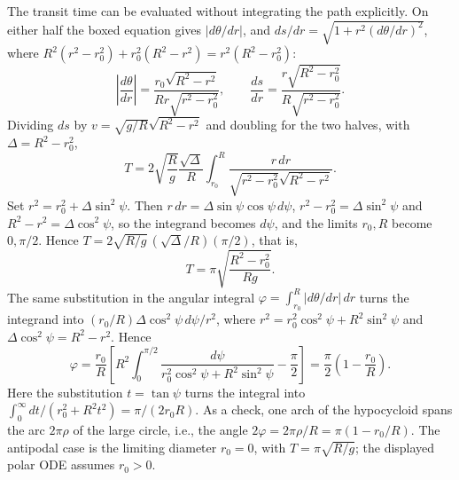 The transit time can be evaluated without integrating the path explicitly.
On either half the boxed equation gives $|d\theta/dr|$, and
$ds/dr=\sqrt{1+r^2(d\theta/dr)^2}$, where
$R^2(r^2-r_0^2)+r_0^2(R^2-r^2)=r^2(R^2-r_0^2)$:
\[
\left|\frac{d\theta}{dr}\right|=
\frac{r_0\sqrt{R^2-r^2}}{Rr\sqrt{r^2-r_0^2}},\qquad
\frac{ds}{dr}=
\frac{r\sqrt{R^2-r_0^2}}{R\sqrt{r^2-r_0^2}}.
\]
Dividing $ds$ by $v=\sqrt{g/R}\sqrt{R^2-r^2}$ and doubling for the
two halves, with $\Delta=R^2-r_0^2$,
\[
T=2\sqrt{\frac Rg}\frac{\sqrt\Delta}{R}
\int_{r_0}^R\frac{r\,dr}
{\sqrt{r^2-r_0^2}\sqrt{R^2-r^2}}.
\]
Set $r^2=r_0^2+\Delta\sin^2\psi$. Then $r\,dr=\Delta\sin\psi\cos\psi\,d\psi$,
$r^2-r_0^2=\Delta\sin^2\psi$ and $R^2-r^2=\Delta\cos^2\psi$, so the
integrand becomes $d\psi$, and the limits $r_0,R$ become $0,\pi/2$.
Hence $T=2\sqrt{R/g}\,(\sqrt\Delta/R)(\pi/2)$, that is,
\[
\boxed{T=\pi\sqrt{\frac{R^2-r_0^2}{Rg}}}.
\]
The same substitution in the angular integral
$\varphi=\int_{r_0}^R|d\theta/dr|\,dr$ turns the integrand into
$(r_0/R)\Delta\cos^2\psi\,d\psi/r^2$, where
$r^2=r_0^2\cos^2\psi+R^2\sin^2\psi$ and
$\Delta\cos^2\psi=R^2-r^2$. Hence
\[
\varphi=\frac{r_0}{R}\left[
R^2\int_0^{\pi/2}\frac{d\psi}
{r_0^2\cos^2\psi+R^2\sin^2\psi}-\frac\pi2\right]
=\frac\pi2\left(1-\frac{r_0}{R}\right).
\]
Here the substitution $t=\tan\psi$ turns the integral into
$\int_0^\infty dt/(r_0^2+R^2t^2)=\pi/(2r_0R)$. As a check, one arch
of the hypocycloid spans the arc $2\pi\rho$ of the large circle, i.e.,
the angle $2\varphi=2\pi\rho/R=\pi(1-r_0/R)$.
The antipodal case is the limiting diameter $r_0=0$,
with $T=\pi\sqrt{R/g}$; the displayed polar ODE assumes $r_0>0$.


